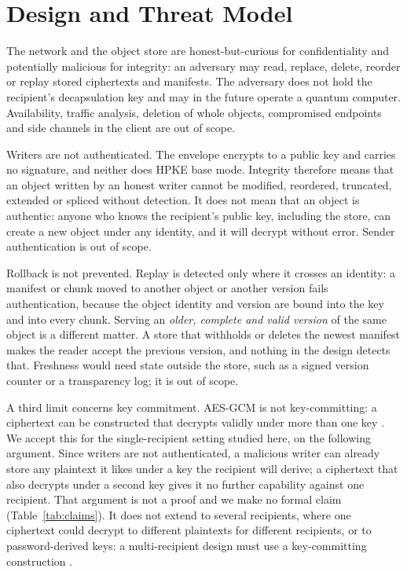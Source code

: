 \documentclass[conference]{IEEEtran}
\begin{document}
\section{Design and Threat Model}\label{sec:design}\label{sec:n1design}\label{sec:hpke}
The network and the object store are honest-but-curious for confidentiality and potentially
malicious for integrity: an adversary may read, replace, delete, reorder or replay stored
ciphertexts and manifests. The adversary does not hold the recipient's decapsulation key and may
in the future operate a quantum computer. Availability, traffic analysis, deletion of whole
objects, compromised endpoints and side channels in the client are out of scope.

Writers are not authenticated. The envelope encrypts to a public key and carries no
signature, and neither does HPKE base mode. Integrity therefore means that an object written
by an honest writer cannot be modified, reordered, truncated, extended or spliced without
detection. It does not mean that an object is authentic: anyone who knows the recipient's public
key, including the store, can create a new object under any identity, and it will decrypt
without error. Sender authentication is out of scope.

Rollback is not prevented. Replay is detected only where it crosses an identity: a
manifest or chunk moved to another object or another version fails authentication, because the
object identity and version are bound into the key and into every chunk. Serving an
\emph{older, complete and valid version} of the same object is a different matter. A store that
withholds or deletes the newest manifest makes the reader accept the previous version, and
nothing in the design detects that. Freshness would need state outside the store, such as a
signed version counter or a transparency log; it is out of scope.

A third limit concerns key commitment. AES-GCM is not key-committing: a ciphertext can be constructed that
decrypts validly under more than one key
\cite{dodis2018,len2021}.
We accept this for the single-recipient setting studied here, on the following argument. Since
writers are not authenticated, a malicious writer can already store any plaintext it likes
under a key the recipient will derive; a ciphertext that also decrypts under a second key gives
it no further capability against one recipient. That argument is not a proof and we make no
formal claim (Table~\ref{tab:claims}). It does not extend to several recipients, where one
ciphertext could decrypt to different plaintexts for different recipients, or to
password-derived keys: a multi-recipient design must use a
key-committing construction
\cite{albertini2022}.
\end{document}
